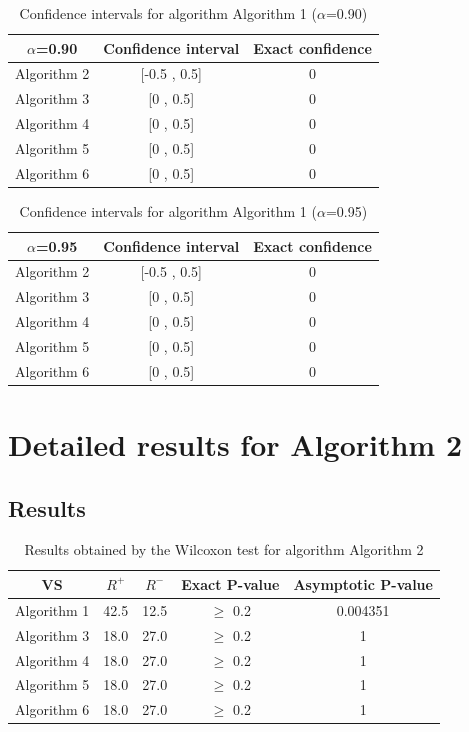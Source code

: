 \documentclass[a4paper,10pt]{article}
\begin{document}
\begin{table}[!htp]
\centering\small
\begin{tabular}{
|c|c|c|}
\hline
 $\alpha$=0.90 & Confidence interval & Exact confidence \\ \hline 
Algorithm 2 & [-0.5 , 0.5] & 0\\ \hline 
Algorithm 3 & [0 , 0.5] & 0\\ \hline 
Algorithm 4 & [0 , 0.5] & 0\\ \hline 
Algorithm 5 & [0 , 0.5] & 0\\ \hline 
Algorithm 6 & [0 , 0.5] & 0\\ \hline 

\end{tabular}
\caption{Confidence intervals for algorithm Algorithm 1 ($\alpha$=0.90)}
\end{table}
\begin{table}[!htp]
\centering\small
\begin{tabular}{
|c|c|c|}
\hline
 $\alpha$=0.95 & Confidence interval & Exact confidence \\ \hline 
Algorithm 2 & [-0.5 , 0.5] & 0\\ \hline 
Algorithm 3 & [0 , 0.5] & 0\\ \hline 
Algorithm 4 & [0 , 0.5] & 0\\ \hline 
Algorithm 5 & [0 , 0.5] & 0\\ \hline 
Algorithm 6 & [0 , 0.5] & 0\\ \hline 

\end{tabular}
\caption{Confidence intervals for algorithm Algorithm 1 ($\alpha$=0.95)}
\end{table}

 \clearpage 


\section{Detailed results for Algorithm 2}


\subsection{Results}

\begin{table}[!htp]
\centering\small
\begin{tabular}{
|c|c|c|c|c|}
\hline
 VS & $R^{+}$ & $R^{-}$ & Exact P-value & Asymptotic P-value \\ \hline 
Algorithm 1 & 42.5 & 12.5 & $\geq$ 0.2 & 0.004351\\ \hline 
Algorithm 3 & 18.0 & 27.0 & $\geq$ 0.2 & 1\\ \hline 
Algorithm 4 & 18.0 & 27.0 & $\geq$ 0.2 & 1\\ \hline 
Algorithm 5 & 18.0 & 27.0 & $\geq$ 0.2 & 1\\ \hline 
Algorithm 6 & 18.0 & 27.0 & $\geq$ 0.2 & 1\\ \hline 

\end{tabular}
\caption{Results obtained by the Wilcoxon test for algorithm Algorithm 2}
\end{table}
\end{document}
